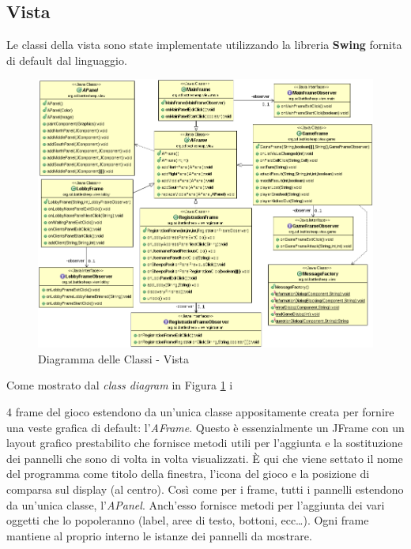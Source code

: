 \subsection{Vista}
Le classi della vista sono state implementate utilizzando la libreria
\textbf{Swing} fornita di default dal linguaggio.\newline

\iftrue

\begin{figure}[!ht]
	\centering
	\includegraphics[scale=0.45,center]{core/imgs/UML/VistaBellaUML-noattr.png}
	\caption{Diagramma delle Classi - Vista}
	\label{figure:class_diagram_view}
\end{figure}
Come mostrato dal \textit{class diagram} in Figura
\ref{figure:class_diagram_view} i
\else
I
\fi
 4 frame del gioco estendono da un'unica
classe appositamente creata per fornire una veste grafica di default:
l'\textit{AFrame}. Questo è essenzialmente un JFrame con un layout grafico
prestabilito che fornisce metodi utili per l'aggiunta e la sostituzione dei
pannelli che sono di volta in volta visualizzati. È qui che viene settato il
nome del programma come titolo della finestra, l'icona del gioco e la posizione
di comparsa sul display (al centro).\newline
Così come per i frame, tutti i pannelli estendono da un'unica classe,
l'\textit{APanel}. Anch'esso fornisce metodi per l'aggiunta dei vari oggetti che
lo popoleranno (label, aree di testo, bottoni, ecc\dots). Ogni frame mantiene al
proprio interno le istanze dei pannelli da mostrare.\newline
